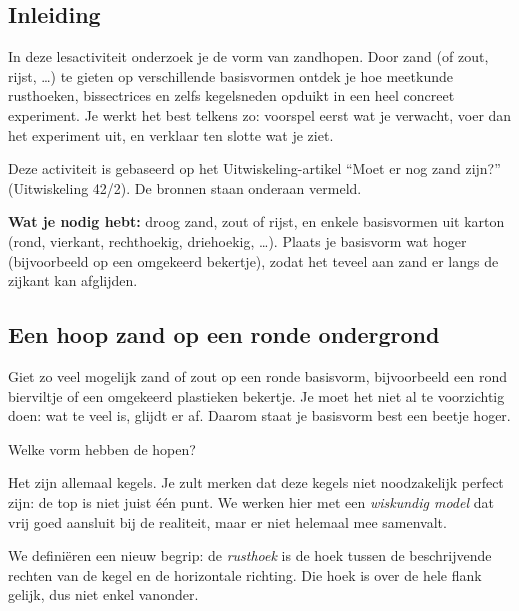 \documentclass{ximera}
\begin{document}
\author{Alexander Holvoet}


\subsection*{Inleiding}

In deze lesactiviteit onderzoek je de vorm van zandhopen. Door zand (of zout, rijst, \ldots)
te gieten op verschillende basisvormen ontdek je hoe meetkunde \textemdash{} rusthoeken,
bissectrices en zelfs kegelsneden \textemdash{} opduikt in een heel concreet experiment.
Je werkt het best telkens zo: voorspel eerst wat je verwacht, voer dan het experiment uit,
en verklaar ten slotte wat je ziet.

Deze activiteit is gebaseerd op het Uitwiskeling-artikel ``Moet er nog zand zijn?''
(Uitwiskeling 42/2). De bronnen staan onderaan vermeld.

\textbf{Wat je nodig hebt:} droog zand, zout of rijst, en enkele basisvormen uit karton
(rond, vierkant, rechthoekig, driehoekig, \ldots). Plaats je basisvorm wat hoger
(bijvoorbeeld op een omgekeerd bekertje), zodat het teveel aan zand er langs de zijkant
kan afglijden.


\subsection*{Een hoop zand op een ronde ondergrond}

Giet zo veel mogelijk zand of zout op een ronde basisvorm, bijvoorbeeld een rond
bierviltje of een omgekeerd plastieken bekertje. Je moet het niet al te voorzichtig doen:
wat te veel is, glijdt er af. Daarom staat je basisvorm best een beetje hoger.

\begin{exercise}
    Welke vorm hebben de hopen?
    \begin{oplossing}
        Het zijn allemaal kegels. Je zult merken dat deze kegels niet noodzakelijk perfect
        zijn: de top is niet juist \'e\'en punt. We werken hier met een \textit{wiskundig
        model} dat vrij goed aansluit bij de realiteit, maar er niet helemaal mee samenvalt.
    \end{oplossing}
\end{exercise}

We definiëren een nieuw begrip: de \emph{rusthoek} is de hoek tussen de beschrijvende
rechten van de kegel en de horizontale richting. Die hoek is over de hele flank gelijk,
dus niet enkel vanonder.
\end{document}
